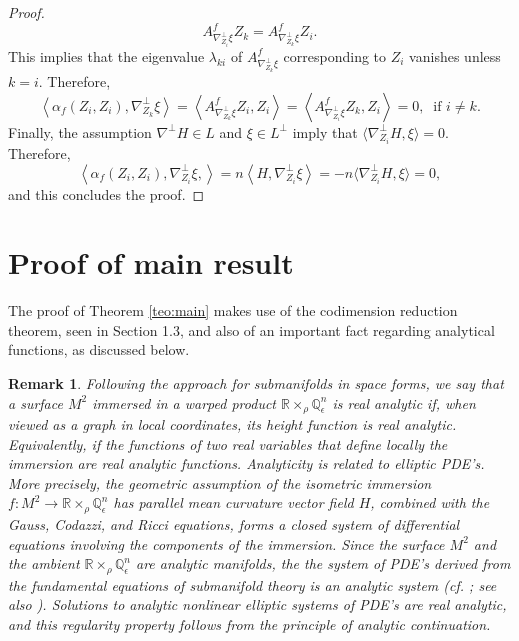 \documentclass[11pt,a4paper]{article}
\newtheorem{rem}[defi]{Remark}
\numberwithin{equation}{section}
\newcommand{\R}{\mathbb{R}}
\newcommand{\Q}{\mathbb{Q}}
\newcommand{\WP}{\R\times_{\rho}\Q^n_{\epsilon}}
\newcommand{\co}{\colon}
\begin{document}
\begin{proof}
\[
A^f_{\nabla_{Z_{i}}^{\perp}\xi}Z_{k}= A^f_{\nabla_{Z_{k}}^{\perp}\xi}Z_{i}.
\]
This implies that the eigenvalue $\lambda_{ki}$ of $A^f_{\nabla_{Z_{k}}^{\perp}\xi}$ corresponding to $Z_i$ vanishes unless $k=i$. Therefore,
\[
\left\langle\alpha_f(Z_i,Z_i),\nabla_{Z_{k}}^{\perp}\xi\right\rangle = \left\langle A^f_{\nabla_{Z_{k}}^{\perp}\xi}Z_i, Z_i\right\rangle = \left\langle A^f_{\nabla_{Z_{i}}^{\perp}\xi}Z_k,Z_i\right\rangle=0, \ \textrm{ if } i\neq k.
\]
Finally, the assumption $\nabla^{\perp}H\in L$ and $\xi\in L^{\perp}$ imply that $\langle\nabla^{\perp}_{Z_i}H,\xi\rangle=0$. Therefore,
\[
\left\langle\alpha_f(Z_{i},Z_{i}),\nabla_{Z_{i}}^{\perp}\xi, \right\rangle= n\left\langle H,\nabla_{Z_i}^{\perp}\xi\right\rangle = -n\langle\nabla^{\perp}_{Z_i}H,\xi\rangle = 0,
\]
and this concludes the proof.
\end{proof}


\section{Proof of main result }

The proof of Theorem \ref{teo:main} makes use of the codimension reduction theorem, seen in Section 1.3, and also of an important fact regarding analytical functions, as discussed below.

\begin{rem} \label{rem:analytic}
Following the approach for submanifolds in space forms, we say that a surface $M^2$ immersed in a warped product $\WP$ is real analytic if, when viewed as a graph in local coordinates, its height function is real analytic. Equivalently, if the functions of two real variables that define locally the immersion are real analytic functions. Analyticity is related to elliptic PDE's. More precisely, the geometric assumption of the isometric immersion $f\co M^2\to\WP$ has parallel mean curvature vector field $H$, combined with the Gauss, Codazzi, and Ricci equations, forms a closed system of differential equations involving the components of the immersion. Since the surface $M^2$ and the ambient $\WP$ are analytic manifolds, the the system of PDE's derived from the fundamental equations of submanifold theory is an analytic system (cf. \cite{Mo}; see also \cite{Bl}). Solutions to analytic nonlinear elliptic systems of PDE's are real analytic, and this regularity property follows from the principle of analytic continuation. 
\end{rem}
\end{document}
